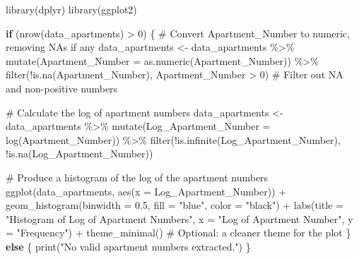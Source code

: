 \documentclass[
  12pt,
]{article}
\newenvironment{Shaded}{\begin{snugshade}}{\end{snugshade}}
\newcommand{\AttributeTok}[1]{\textcolor[rgb]{0.40,0.45,0.13}{#1}}
\newcommand{\CommentTok}[1]{\textcolor[rgb]{0.37,0.37,0.37}{#1}}
\newcommand{\ControlFlowTok}[1]{\textcolor[rgb]{0.00,0.23,0.31}{\textbf{#1}}}
\newcommand{\DecValTok}[1]{\textcolor[rgb]{0.68,0.00,0.00}{#1}}
\newcommand{\FloatTok}[1]{\textcolor[rgb]{0.68,0.00,0.00}{#1}}
\newcommand{\FunctionTok}[1]{\textcolor[rgb]{0.28,0.35,0.67}{#1}}
\newcommand{\NormalTok}[1]{\textcolor[rgb]{0.00,0.23,0.31}{#1}}
\newcommand{\OtherTok}[1]{\textcolor[rgb]{0.00,0.23,0.31}{#1}}
\newcommand{\SpecialCharTok}[1]{\textcolor[rgb]{0.37,0.37,0.37}{#1}}
\newcommand{\StringTok}[1]{\textcolor[rgb]{0.13,0.47,0.30}{#1}}
\begin{document}
\begin{Shaded}
\begin{Highlighting}[]
\FunctionTok{library}\NormalTok{(dplyr)}
\FunctionTok{library}\NormalTok{(ggplot2)}

\ControlFlowTok{if}\NormalTok{ (}\FunctionTok{nrow}\NormalTok{(data\_apartments) }\SpecialCharTok{\textgreater{}} \DecValTok{0}\NormalTok{) \{}
    \CommentTok{\# Convert Apartment\_Number to numeric, removing NAs if any}
\NormalTok{    data\_apartments }\OtherTok{\textless{}{-}}\NormalTok{ data\_apartments }\SpecialCharTok{\%\textgreater{}\%}
      \FunctionTok{mutate}\NormalTok{(}\AttributeTok{Apartment\_Number =} \FunctionTok{as.numeric}\NormalTok{(Apartment\_Number)) }\SpecialCharTok{\%\textgreater{}\%}
      \FunctionTok{filter}\NormalTok{(}\SpecialCharTok{!}\FunctionTok{is.na}\NormalTok{(Apartment\_Number), Apartment\_Number }\SpecialCharTok{\textgreater{}} \DecValTok{0}\NormalTok{)  }\CommentTok{\# Filter out NA and non{-}positive numbers}

    \CommentTok{\# Calculate the log of apartment numbers}
\NormalTok{    data\_apartments }\OtherTok{\textless{}{-}}\NormalTok{ data\_apartments }\SpecialCharTok{\%\textgreater{}\%}
      \FunctionTok{mutate}\NormalTok{(}\AttributeTok{Log\_Apartment\_Number =} \FunctionTok{log}\NormalTok{(Apartment\_Number)) }\SpecialCharTok{\%\textgreater{}\%}
      \FunctionTok{filter}\NormalTok{(}\SpecialCharTok{!}\FunctionTok{is.infinite}\NormalTok{(Log\_Apartment\_Number), }\SpecialCharTok{!}\FunctionTok{is.na}\NormalTok{(Log\_Apartment\_Number))}

    \CommentTok{\# Produce a histogram of the log of the apartment numbers}
    \FunctionTok{ggplot}\NormalTok{(data\_apartments, }\FunctionTok{aes}\NormalTok{(}\AttributeTok{x =}\NormalTok{ Log\_Apartment\_Number)) }\SpecialCharTok{+}
      \FunctionTok{geom\_histogram}\NormalTok{(}\AttributeTok{binwidth =} \FloatTok{0.5}\NormalTok{, }\AttributeTok{fill =} \StringTok{"blue"}\NormalTok{, }\AttributeTok{color =} \StringTok{"black"}\NormalTok{) }\SpecialCharTok{+}
      \FunctionTok{labs}\NormalTok{(}\AttributeTok{title =} \StringTok{"Histogram of Log of Apartment Numbers"}\NormalTok{,}
           \AttributeTok{x =} \StringTok{"Log of Apartment Number"}\NormalTok{,}
           \AttributeTok{y =} \StringTok{"Frequency"}\NormalTok{) }\SpecialCharTok{+}
      \FunctionTok{theme\_minimal}\NormalTok{()  }\CommentTok{\# Optional: a cleaner theme for the plot}
\NormalTok{\} }\ControlFlowTok{else}\NormalTok{ \{}
    \FunctionTok{print}\NormalTok{(}\StringTok{"No valid apartment numbers extracted."}\NormalTok{)}
\NormalTok{\}}
\end{Highlighting}
\end{Shaded}
\end{document}
